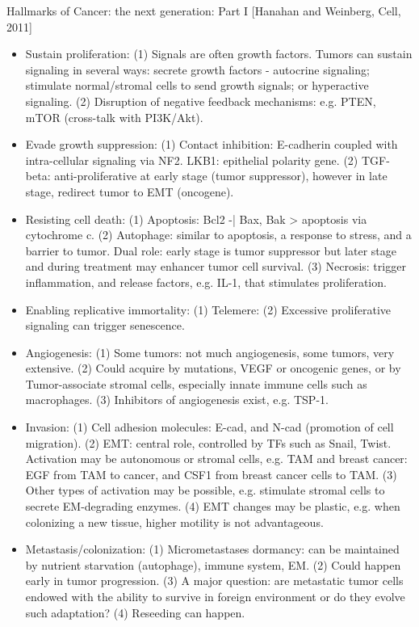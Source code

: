 \documentclass{report}
\begin{document}
Hallmarks of Cancer: the next generation: Part I [Hanahan and Weinberg, Cell, 2011]
\begin{itemize}
	
	\item Sustain proliferation: (1) Signals are often growth factors. Tumors can sustain signaling in several ways: secrete growth factors - autocrine signaling; stimulate normal/stromal cells to send growth signals; or hyperactive signaling. (2) Disruption of negative feedback mechanisms: e.g. PTEN, mTOR (cross-talk with PI3K/Akt). 
	
	\item Evade growth suppression: (1) Contact inhibition: E-cadherin coupled with intra-cellular signaling via NF2. LKB1: epithelial polarity gene. (2) TGF-beta: anti-proliferative at early stage (tumor suppressor), however in late stage, redirect tumor to EMT (oncogene). 
	
	\item Resisting cell death: (1) Apoptosis: Bcl2 -| Bax, Bak > apoptosis via cytochrome c. (2) Autophage: similar to apoptosis, a response to stress, and a barrier to tumor. Dual role: early stage is tumor suppressor but later stage and during treatment may enhancer tumor cell survival. (3) Necrosis: trigger inflammation, and release factors, e.g. IL-1, that stimulates proliferation. 
	
	\item Enabling replicative immortality: (1) Telemere: (2) Excessive proliferative signaling can trigger senescence. 
	
	\item Angiogenesis: (1) Some tumors: not much angiogenesis, some tumors, very extensive. (2) Could acquire by mutations, VEGF or oncogenic genes, or by Tumor-associate stromal cells, especially innate immune cells such as macrophages. (3) Inhibitors of angiogenesis exist, e.g. TSP-1. 
	
	\item Invasion: (1) Cell adhesion molecules: E-cad, and N-cad (promotion of cell migration). (2) EMT: central role, controlled by TFs such as Snail, Twist. Activation may be autonomous or stromal cells, e.g. TAM and breast cancer: EGF from TAM to cancer, and CSF1 from breast cancer cells to TAM. (3) Other types of activation may be possible, e.g. stimulate stromal cells to secrete EM-degrading enzymes. (4) EMT changes may be plastic, e.g. when colonizing a new tissue, higher motility is not advantageous. 
	
	\item Metastasis/colonization: (1) Micrometastases dormancy:  can be maintained by nutrient starvation (autophage), immune system, EM. (2) Could happen early in tumor progression. (3) A major question: are metastatic tumor cells endowed with the ability to survive in foreign environment or do they evolve such adaptation? (4) Reseeding can happen. 
	

\end{itemize}
\end{document}
